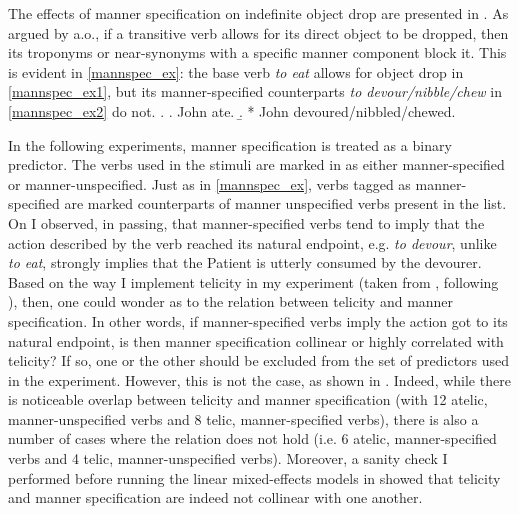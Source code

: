 The effects of manner specification on indefinite object drop are presented in . As argued by \textcite{Ruda2017} a.o., if a transitive verb allows for its direct object to be dropped, then its troponyms or near-synonyms with a specific manner component block it. This is evident in \ref{mannspec_ex}: the base verb \textit{to eat} allows for object drop in \ref{mannspec_ex1}, but its manner-specified counterparts \textit{to devour/nibble/chew} in \ref{mannspec_ex2} do not.
\ex.\label{mannspec_ex} \a. John ate. \label{mannspec_ex1} 
\b. * John devoured/nibbled/chewed. \label{mannspec_ex2}

In the following experiments, manner specification is treated as a binary predictor. The verbs used in the stimuli are marked in  as either manner-specified or manner-unspecified. Just as in \ref{mannspec_ex}, verbs tagged as manner-specified are marked counterparts of manner unspecified verbs present in the list.\\
On  I observed, in passing, that manner-specified verbs tend to imply that the action described by the verb reached its natural endpoint, e.g. \textit{to devour}, unlike \textit{to eat}, strongly implies that the Patient is utterly consumed by the devourer. Based on the way I implement telicity in my experiment (taken from \textcite{Olsen1997}, following \textcite{Medina2007}), then, one could wonder as to the relation between telicity and manner specification. In other words, if manner-specified verbs imply the action got to its natural endpoint, is then manner specification collinear or highly correlated with telicity? If so, one or the other should be excluded from the set of predictors used in the experiment. However, this is not the case, as shown in . Indeed, while there is noticeable overlap between telicity and manner specification (with 12 atelic, manner-unspecified verbs and 8 telic, manner-specified verbs), there is also a number of cases where the relation does not hold (i.e. 6 atelic, manner-specified verbs and 4 telic, manner-unspecified verbs). Moreover, a sanity check I performed before running the linear mixed-effects models in  showed that telicity and manner specification are indeed not collinear with one another.